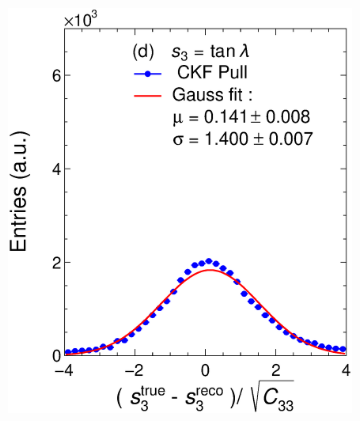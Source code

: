 \begin{figure}[t]
\begin{subfigure}{0.32\textwidth}
         \caption{}
         \label{fig:resp2KFGAr_Int}
     \end{subfigure}
          \begin{subfigure}{0.32\textwidth}
         \centering
         \includegraphics[width=\textwidth]{figures/ch5-KF_NDGAr/FullSample/Int/Units/Unit3.eps}
         \caption{}
         \label{fig:resp3KFGAr_Int}
     \end{subfigure}
     \begin{subfigure}{0.32\textwidth}
         \centering

\end{subfigure}
\end{figure}
